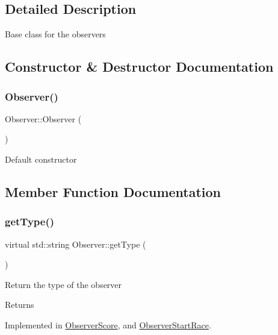 \subsection{Detailed Description}
Base class for the observers 

\subsection{Constructor \& Destructor Documentation}
\mbox{\label{classObserver_a19c43f80a38a332a6f694783df3c9835}} 
\subsubsection{\texorpdfstring{Observer()}{Observer()}}
{\footnotesize\ttfamily Observer\+::\+Observer (\begin{DoxyParamCaption}{ }\end{DoxyParamCaption})}

Default constructor 

\subsection{Member Function Documentation}
\mbox{\label{classObserver_a92f704d0a3e6e0ade2743da2ae91bcb7}} 
\subsubsection{\texorpdfstring{get\+Type()}{getType()}}
{\footnotesize\ttfamily virtual std\+::string Observer\+::get\+Type (\begin{DoxyParamCaption}{ }\end{DoxyParamCaption})\hspace{0.3cm}{\ttfamily [pure virtual]}}

Return the type of the observer \begin{DoxyReturn}{Returns}

\end{DoxyReturn}


Implemented in \hyperlink{classObserverScore_a88ee2b9fe8b49edf234f6c05aa242724}{Observer\+Score}, and \hyperlink{classObserverStartRace_af664693404c9c8f756a8e4ba7d687c3a}{Observer\+Start\+Race}.

